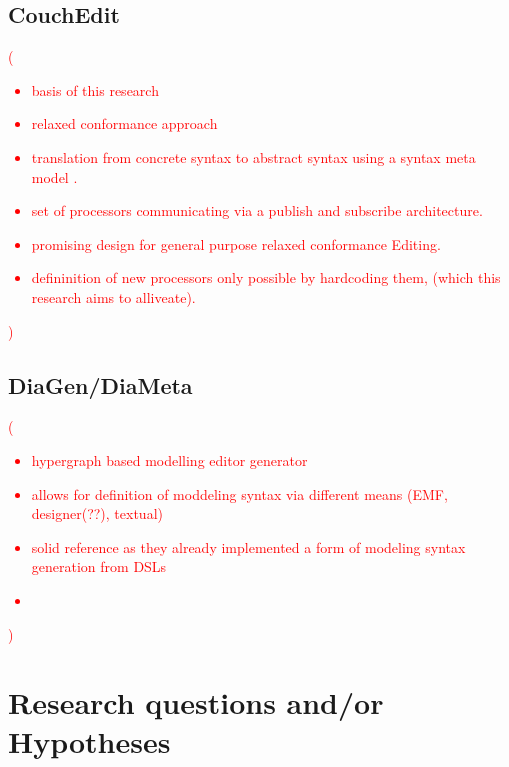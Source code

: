 \documentclass[10pt,a4paper,oneside]{scrartcl}
\newcommand\comment[1]{\textcolor{red}{(#1)}}
\begin{document}
\subsection{CouchEdit}
\label{CouchEdit}

\comment{
  \begin{itemize}
    \item basis of this research
    \item relaxed conformance approach
    \item translation from concrete syntax to abstract syntax using a syntax meta model \cite{van_tendeloo_concrete_2017}.
    \item set of processors communicating via a publish and subscribe architecture.
    \item promising design for general purpose relaxed conformance Editing.
    \item defininition of new processors only possible by hardcoding them, (which this research aims to alliveate).
  \end{itemize}
}


\subsection{DiaGen/DiaMeta}
\label{DiaGen/DiaMeta}

\comment{
  \begin{itemize}
    \item hypergraph based modelling editor generator
    \item allows for definition of moddeling syntax via different means (EMF, designer(??), textual)
    \item solid reference as they already implemented a form of modeling syntax generation from DSLs
    \item 
  \end{itemize}
}

\section{Research questions and/or Hypotheses}
\label{sub:questions}
\end{document}
